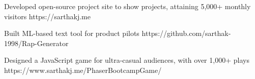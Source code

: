 

{Developed open-source project site to show projects, attaining 5,000+ monthly visitors} {https://sarthakj.me}


{ Built ML-based text tool for product pilots} {https://github.com/sarthak-1998/Rap-Generator}

{Designed a JavaScript game for ultra-casual audiences, with over 1,000+ plays} {https://www.sarthakj.me/PhaserBootcampGame/}














    

